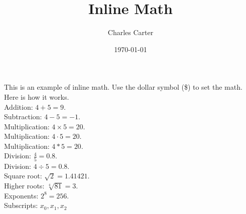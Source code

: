 \documentclass{article}
\title{Inline Math}
\author{Charles Carter}
\date{\today{}}
\begin{document}
 
    \maketitle{}
	This is an example of inline math. Use the dollar symbol (\$) to set the math. \\
	Here is how it works. \\
    Addition: $4 + 5 = 9$. \\
    Subtraction: $4 - 5 = -1$. \\
    Multiplication: $4 \times 5 = 20$. \\
    Multiplication: $4 \cdot 5 = 20$. \\
    Multiplication: $4 \ast 5 = 20$.\\
    Division: $\frac{4}{5} = 0.8$. \\
    Division: $4 \div 5 = 0.8$. \\
    Square root: $\sqrt{2} = 1.41421$. \\
    Higher roots: $\sqrt[4]{81} = 3$.\\
    Exponents: $2^8 = 256$.\\
	Subscripts: $x_0, x_1, x_2$
\end{document}

